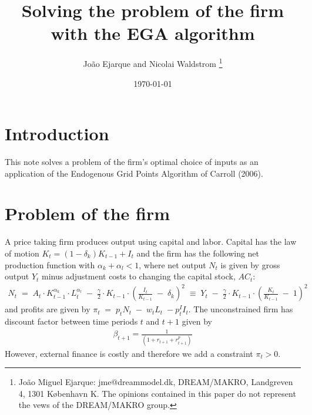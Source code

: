 \documentclass[danish]{article}
\begin{document}
\title{Solving the problem of the firm with the EGA algorithm}


\author{João Ejarque and Nicolai Waldstrom \footnote{João Miguel Ejarque: jme@dreammodel.dk, DREAM/MAKRO, Landgreven 4, 1301 København K. The opinions contained in this paper do not represent the vews of the DREAM/MAKRO group.} }

\date{\today}


\maketitle


\section{Introduction} 

This note solves a problem of the firm's optimal choice of inputs as an application of the Endogenous Grid Points Algorithm of Carroll (2006).

\section{Problem of the firm}

A price taking firm produces output using capital and labor. Capital has the law of motion  $K_t =  \left(1-\delta_k \right) K_{t-1} + I_t$ and the firm has the following net production function with $\alpha_k+\alpha_l<1$, where net output $N_t$ is given by gross output $Y_t$ minus adjustment costs to changing the capital stock, $AC_t$:
\begin{gather*}
N_t \;= \; A_t \cdot K^{\alpha_k}_{t-1} \cdot L^{\alpha_l}_{t}   \;  - \; \frac{\gamma}{2}\cdot K_{t-1}\cdot \left(  \frac{I_t}{K_{t-1}}  \; - \;  \delta_k   \right)^2 \; \equiv \; Y_t   \;  - \; \frac{\gamma}{2}\cdot K_{t-1}\cdot \left(  \frac{K_t}{K_{t-1}}  \; -\;  1   \right)^2 
\end{gather*}
and profits are given by $\pi_t \;= \; p_t N_t   \; - \; w_t L_t \; - p^I_t I_t$. The unconstrained firm has discount factor between time periods $t$ and $t+1$ given by 
\begin{gather*}
\beta_{t+1} = \frac{1}{\left(1+r_{t+1} + r^p_{t+1} \right)}
\end{gather*}
However, external finance is costly and therefore we add a constraint $\pi_t>0$.
\end{document}
